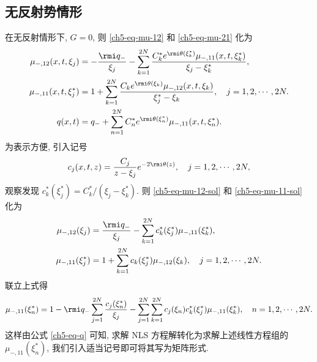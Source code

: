 \subsection{无反射势情形}
在无反射情形下, $G=0$, 则 \eqref{ch5-eq-mu-12} 和 \eqref{ch5-eq-mu-21} 化为
\begin{align}
    \mu_{-,12}(x, t, \xi_{j})     & = - \frac{\rmi q_{-}}{\xi_{j}} - \sum_{k=1}^{2N} \frac{C_{k}^{*} e^{\rmi \theta(\xi_{k}^{*})} \mu_{-,11}(x, t, \xi_{k}^{*})}{\xi_{j} - \xi_{k}^{*}}, \label{ch5-eq-mu-12-sol} \\
    \mu_{-,11}(x, t, \xi_{j}^{*}) & = 1 + \sum_{k=1}^{2N} \frac{C_{k} e^{\rmi \theta(\xi_{k})} \mu_{-,12}(x, t, \xi_{k})}{\xi_{j}^{*} - \xi_{k}}, \quad j = 1, 2, \cdots, 2 N. \label{ch5-eq-mu-11-sol}           \\
    q(x,t)                        & = q_{-} + \sum_{n=1}^{2N} C_{n}^{*} e^{\rmi \theta(\xi_{n}^{*})} \mu_{-,11}(x, t, \xi_{n}^{*}). \label{ch5-eq-q}
\end{align}
为表示方便, 引入记号
\begin{equation}
    c_{j}(x, t, z) = \frac{C_{j}}{z - \xi_{j}} e^{-2\rmi \theta(z)}, \quad j = 1, 2, \cdots, 2 N,
\end{equation}
观察发现 $c_{k}^{*}(\xi_{j}^{*}) = C_{k}^{*}/(\xi_{j} - \xi_{k}^{*})$. 则 \eqref{ch5-eq-mu-12-sol} 和 \eqref{ch5-eq-mu-11-sol} 化为
\begin{align}
    \mu_{-,12}(\xi_{j})     & = \frac{\rmi q_{-}}{\xi_{j}} - \sum_{k=1}^{2N} c_{k}^{*}(\xi_{j}^{*}) \mu_{-,11}(\xi_{k}^{*}), \\
    \mu_{-,11}(\xi_{j}^{*}) & = 1 + \sum_{k=1}^{2N} c_{k}(\xi_{j}^{*}) \mu_{-,12}(\xi_{k}), \quad j = 1, 2, \cdots, 2 N.
\end{align}
联立上式得
\begin{equation}
    \mu_{-,11}(\xi_{n}^{*}) = 1 - \rmi q_{-} \sum_{j=1}^{2N} \frac{c_{j}(\xi_{n}^{*})}{\xi_{j}} - \sum_{j=1}^{2N} \sum_{k=1}^{2N} c_{j}(\xi_{n}) c_{k}^{*}(\xi_{j}^{*}) \mu_{-,11}(\xi_{k}^{*}), \quad n = 1, 2, \cdots, 2 N.
    \label{ch5-eq-mu11}
\end{equation}
这样由公式 \eqref{ch5-eq-q} 可知, 求解 NLS 方程解转化为求解上述线性方程组的 $\mu_{-,11}(\xi_{n}^{*})$, 我们引入适当记号即可将其写为矩阵形式.
